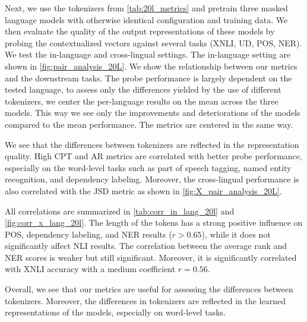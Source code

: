 Next, we use the tokenizers from \autoref{tab:20l_metrics} and pretrain three masked language models with otherwise identical configuration and training data. We then evaluate the quality of the output representations of these models by probing the contextualized vectors against several tasks (XNLI, UD, POS, NER). We test the in-language and cross-lingual settings. The in-language setting are shown in \autoref{fig:pair_analysis_20L}. We show the relationship between our metrics and the downstream tasks. The probe performance is largely dependent on the tested language, to assess only the differences yielded by the use of different tokenizers, we center the per-language results on the mean across the three models. This way we see only the improvements and deteriorations of the models compared to the mean performance. The metrics are centered in the same way. 

We see that the differences between tokenizers are reflected in the representation quality. High CPT and AR metrics are correlated with better probe performance, especially on the word-level tasks such as part of speech tagging, named entity recognition, and dependency labeling. Moreover, the cross-lingual performance is also correlated with the JSD metric as shown in \autoref{fig:X_pair_analysis_20L}.


All correlations are summarized in \autoref{tab:corr_in_lang_20l} and \autoref{fig:corr_x_lang_20l}. The length of the tokens has a strong positive influence on POS, dependency labeling, and NER results ($r > 0.65$), while it does not significantly affect NLI results. The correlation between the average rank and NER scores is weaker but still significant. Moreover, it is significantly correlated with XNLI accuracy with a medium coefficient $r = 0.56$. 

Overall, we see that our metrics are useful for assessing the differences between tokenizers. Moreover, the differences in tokenizers are reflected in the learned representations of the models, especially on word-level tasks.



